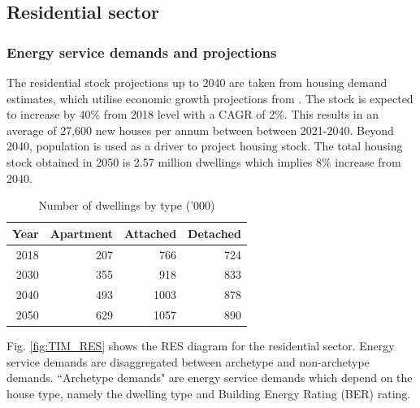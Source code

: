 \documentclass[gmd,manuscript]{copernicus}
\begin{document}
\clearpage

\subsection{Residential sector}
\label{ss:residential}
\subsubsection{Energy service demands and projections}

The residential stock projections up to 2040 are taken from \citet{Bergin2020} housing demand estimates, which utilise economic growth projections from \citet{bergin2017cosmo}. The stock is expected to increase by 40\% from 2018 level with a CAGR of 2\%. This results in an average of 27,600 new houses per annum between between 2021-2040. Beyond 2040, population is used as a driver to project housing stock. The total housing stock obtained in 2050 is 2.57 million dwellings which implies 8\% increase from 2040. 

\begin{table}[htbp]
  \centering
  \footnotesize
  \caption{Number of dwellings by type ('000)}
    \begin{tabular}{rrrr}
    \hline
    \multicolumn{1}{l}{Year} & \multicolumn{1}{l}{Apartment} & \multicolumn{1}{l}{Attached } & \multicolumn{1}{l}{Detached} \\ \hline
    2018  & 207   & 766   & 724 \\
    2030  & 355   & 918   & 833 \\
    2040  & 493   & 1003  & 878 \\
    2050  & 629   & 1057  & 890 \\ \hline
    \end{tabular}%
  \label{table: number of dwellings by type}%
\end{table}%


Fig. \ref{fig:TIM_RES} shows the RES diagram for the residential sector. Energy service demands are disaggregated between archetype and non-archetype demands. ``Archetype demands" are energy service demands which depend on the house type, namely the dwelling type and Building Energy Rating (BER) rating. 
 
\end{document}
